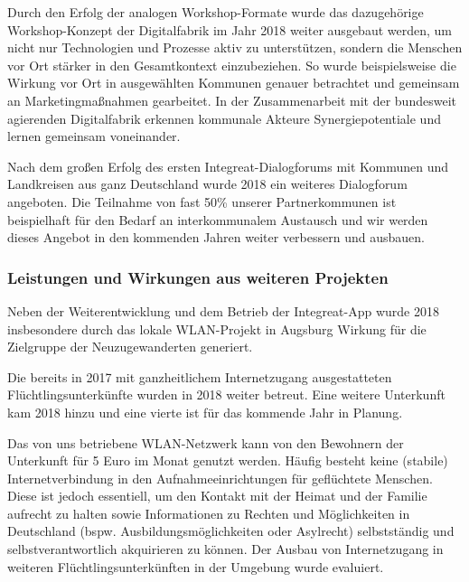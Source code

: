\documentclass[12pt, a4paper]{article} %
\begin{document}
Durch den Erfolg der analogen Workshop-Formate wurde das dazugehörige
Workshop-Konzept der Digitalfabrik im Jahr 2018 weiter ausgebaut werden,
um nicht nur Technologien und Prozesse aktiv zu unterstützen, sondern
die Menschen vor Ort stärker in den Gesamtkontext einzubeziehen. So
wurde beispielsweise die Wirkung vor Ort in ausgewählten Kommunen
genauer betrachtet und gemeinsam an Marketingmaßnahmen gearbeitet. In
der Zusammenarbeit mit der bundesweit agierenden Digitalfabrik erkennen
kommunale Akteure Synergiepotentiale und lernen gemeinsam voneinander.

Nach dem großen Erfolg des ersten Integreat-Dialogforums mit Kommunen
und Landkreisen aus ganz Deutschland wurde 2018 ein weiteres Dialogforum
angeboten. Die Teilnahme von fast 50\% unserer Partnerkommunen ist
beispielhaft für den Bedarf an interkommunalem Austausch und wir werden
dieses Angebot in den kommenden Jahren weiter verbessern und ausbauen.

\hypertarget{leistungen-und-wirkungen-aus-weiteren-projekten}{%
\subsubsection{Leistungen und Wirkungen aus weiteren
Projekten}\label{leistungen-und-wirkungen-aus-weiteren-projekten}}

Neben der Weiterentwicklung und dem Betrieb der Integreat-App wurde 2018
insbesondere durch das lokale WLAN-Projekt in Augsburg Wirkung für die
Zielgruppe der Neuzugewanderten generiert.

Die bereits in 2017 mit ganzheitlichem Internetzugang ausgestatteten
Flüchtlingsunterkünfte wurden in 2018 weiter betreut. Eine weitere
Unterkunft kam 2018 hinzu und eine vierte ist für das kommende Jahr in
Planung.

Das von uns betriebene WLAN-Netzwerk kann von den Bewohnern der
Unterkunft für 5 Euro im Monat genutzt werden. Häufig besteht keine
(stabile) Internetverbindung in den Aufnahmeeinrichtungen für
geflüchtete Menschen. Diese ist jedoch essentiell, um den Kontakt mit
der Heimat und der Familie aufrecht zu halten sowie Informationen zu
Rechten und Möglichkeiten in Deutschland (bspw. Ausbildungsmöglichkeiten
oder Asylrecht) selbstständig und selbstverantwortlich akquirieren zu
können. Der Ausbau von Internetzugang in weiteren
Flüchtlingsunterkünften in der Umgebung wurde evaluiert.
\end{document}
